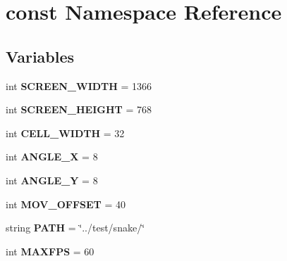 \hypertarget{namespaceconst}{\section{const \-Namespace \-Reference}
\label{namespaceconst}
}
\subsection*{\-Variables}
\begin{DoxyCompactItemize}
\item 
\hypertarget{namespaceconst_ac8eda90d944bbc1b60ab7505a2bca708}{int {\bfseries \-S\-C\-R\-E\-E\-N\-\_\-\-W\-I\-D\-T\-H} = 1366}\label{namespaceconst_ac8eda90d944bbc1b60ab7505a2bca708}

\item 
\hypertarget{namespaceconst_ad151bbdd983c18e643903e71e401b5eb}{int {\bfseries \-S\-C\-R\-E\-E\-N\-\_\-\-H\-E\-I\-G\-H\-T} = 768}\label{namespaceconst_ad151bbdd983c18e643903e71e401b5eb}

\item 
\hypertarget{namespaceconst_a15594d3a296b56978346c0c6e1aeb854}{int {\bfseries \-C\-E\-L\-L\-\_\-\-W\-I\-D\-T\-H} = 32}\label{namespaceconst_a15594d3a296b56978346c0c6e1aeb854}

\item 
\hypertarget{namespaceconst_afe386a192349200e690014cff77f6e01}{int {\bfseries \-A\-N\-G\-L\-E\-\_\-\-X} = 8}\label{namespaceconst_afe386a192349200e690014cff77f6e01}

\item 
\hypertarget{namespaceconst_aee6116c03e45b3480e83482889694921}{int {\bfseries \-A\-N\-G\-L\-E\-\_\-\-Y} = 8}\label{namespaceconst_aee6116c03e45b3480e83482889694921}

\item 
\hypertarget{namespaceconst_a354ea85ac2228565c4394e19b829aa4b}{int {\bfseries \-M\-O\-V\-\_\-\-O\-F\-F\-S\-E\-T} = 40}\label{namespaceconst_a354ea85ac2228565c4394e19b829aa4b}

\item 
\hypertarget{namespaceconst_ace4bfac82d8ef37ccd78c3877230e7fb}{string {\bfseries \-P\-A\-T\-H} = \char`\"{}../test/snake/\char`\"{}}\label{namespaceconst_ace4bfac82d8ef37ccd78c3877230e7fb}

\item 
\hypertarget{namespaceconst_acbd22b4c6e7d00694de411420f2db98d}{int {\bfseries \-M\-A\-X\-F\-P\-S} = 60}\label{namespaceconst_acbd22b4c6e7d00694de411420f2db98d}


\end{DoxyCompactItemize}
